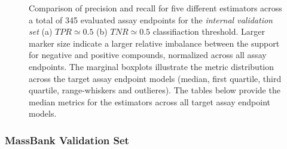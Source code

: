 \begin{figure}
\begin{subfigure}[b]{0.495\textwidth}
  \caption{}
  \label{fig:hitcall_classification_Feature_Selection_XGBClassifier_val_tnr_macro_avg}
\end{subfigure}
\caption{Comparison of precision and recall for five different estimators across a total of 345 evaluated assay endpoints for the \emph{internal validation set} (a) $TPR \simeq 0.5$ (b) $TNR \simeq 0.5$ classifiaction threshold. Larger marker size indicate a larger relative imbalance between the support for negative and positive compounds, normalized across all assay endpoints. The marginal boxplots illustrate the metric distribution across the target assay endpoint models (median, first quartile, third quartile, range-whiskers and outlieres). The tables below provide the median metrics for the estimators across all target assay endpoint models.}
\label{fig:hitcall_classification_Feature_Selection_XGBClassifier_val_default_optimal_macro_avg}
\end{figure}



\newpage
\subsubsection{MassBank Validation Set}\label{sec:massbank_validation_set}

